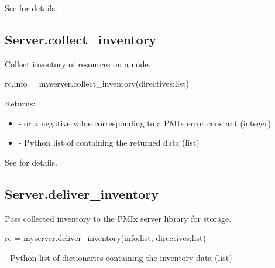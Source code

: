 See  for details.


\subsection{Server.collect_inventory}

\summary
Collect inventory of resources on a node.

\format

\pyspecificstart
\begin{codepar}
rc,info = myserver.collect_inventory(directives:list)
\end{codepar}
\pyspecificend


\begin{arglist}
\end{arglist}

Returns:

\begin{itemize}
    \item {} -  or a negative value corresponding to a PMIx error constant (integer)
    \item {} - Python list of  containing the returned data (list)
\end{itemize}

See  for details.


\subsection{Server.deliver_inventory}

\summary
Pass collected inventory to the \ac{PMIx} server library for storage.

\format

\pyspecificstart
\begin{codepar}
rc = myserver.deliver_inventory(info:list, directives:list)
\end{codepar}
\pyspecificend


\begin{arglist}
 - Python list of  dictionaries containing the inventory data (list)
\end{arglist}

